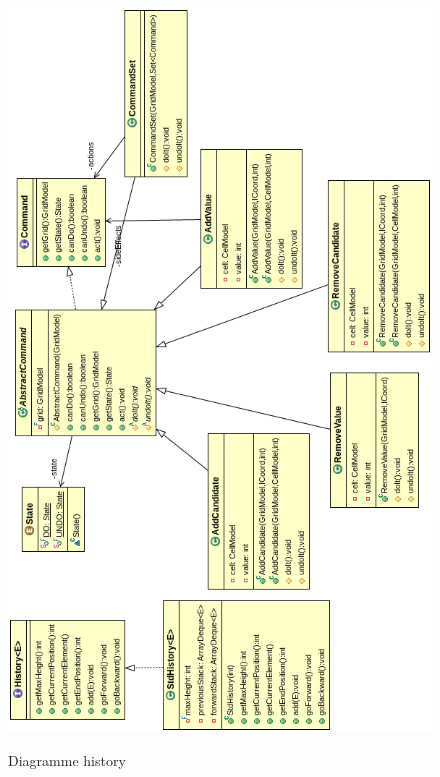 \begin{figure}[ht]
  \caption{\label{annexe17} Diagramme history}
  \includegraphics [width=140mm]{images/history.png} \\[0.5cm]
\end{figure}

